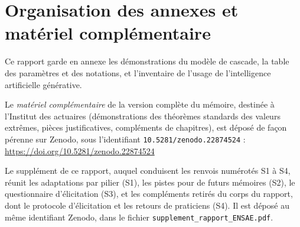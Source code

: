\documentclass[12pt,a4paper]{report}
\begin{document}
\chapter*{Organisation des annexes et matériel complémentaire}

Ce rapport garde en annexe les démonstrations du modèle de cascade, la table des paramètres et des
notations, et l'inventaire de l'usage de l'intelligence artificielle générative.

Le \emph{matériel complémentaire} de la version complète du mémoire, destinée à l'Institut des
actuaires (démonstrations des théorèmes standards des valeurs extrêmes, pièces justificatives,
compléments de chapitres), est déposé de façon pérenne sur Zenodo, sous l'identifiant
\texttt{10.5281/zenodo.22874524} :
\url{https://doi.org/10.5281/zenodo.22874524}

Le supplément de ce rapport, auquel conduisent les renvois numérotés S1 à S4, réunit les
adaptations par pilier (S1), les pistes pour de futurs mémoires (S2), le questionnaire
d'élicitation (S3), et les compléments retirés du corps du rapport, dont le protocole d'élicitation
et les retours de praticiens (S4). Il est déposé
au même identifiant Zenodo, dans le fichier \texttt{supplement\_rapport\_ENSAE.pdf}.%



\clearpage
{}
{}

\end{document}
